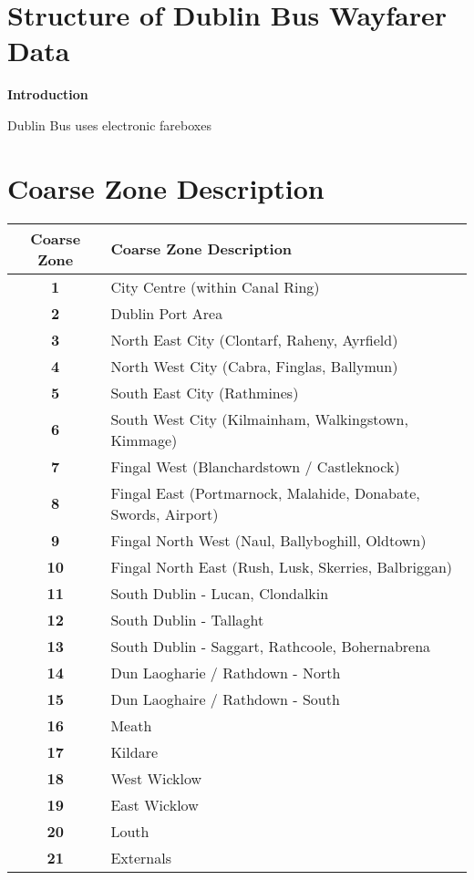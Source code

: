 \appendix

\newpage

\section{Structure of Dublin Bus Wayfarer Data }
\label{app:structure} \textbf{Introduction}

Dublin Bus uses electronic fareboxes

\newpage



\section{Coarse Zone Description}
\label{Appendix: Coarse Zone Description}


\begin{longtable}
{cl} \hline
\endhead
\hline
\endfoot
\textbf{{Coarse Zone}}&
\textbf{{Coarse Zone Description}} \\
\hline \hline\textbf{{1}}&
{City Centre (within Canal Ring)} \\
\hline \textbf{{2}}&
{Dublin Port Area} \\
\hline \textbf{{3}}&
{North East City (Clontarf, Raheny, Ayrfield)} \\
\hline \textbf{{4}}&
{North West City (Cabra, Finglas, Ballymun)} \\
\hline \textbf{{5}}&
{South East City (Rathmines)} \\
\hline \textbf{{6}}&
{South West City (Kilmainham, Walkingstown, Kimmage)} \\
\hline \textbf{{7}}&
{Fingal West (Blanchardstown / Castleknock)} \\
\hline \textbf{{8}}&
{Fingal East (Portmarnock, Malahide, Donabate, Swords, Airport)} \\
\hline \textbf{{9}}&
{Fingal North West (Naul, Ballyboghill, Oldtown)} \\
\hline \textbf{{10}}&
{Fingal North East (Rush, Lusk, Skerries, Balbriggan)} \\
\hline \textbf{{11}}&
{South Dublin - Lucan, Clondalkin} \\
\hline \textbf{{12}}&
{South Dublin - Tallaght} \\
\hline \textbf{{13}}&
{South Dublin - Saggart, Rathcoole, Bohernabrena} \\
\hline \textbf{{14}}&
{Dun Laogharie / Rathdown - North} \\
\hline \textbf{{15}}&
{Dun Laoghaire / Rathdown - South} \\
\hline \textbf{{16}}&
{Meath} \\
\hline \textbf{{17}}&
{Kildare} \\
\hline \textbf{{18}}&
{West Wicklow} \\
\hline \textbf{{19}}&
{East Wicklow} \\
\hline \textbf{{20}}&
{Louth} \\
\hline \textbf{{21}}& {Externals} \label{tab1}
\end{longtable}


